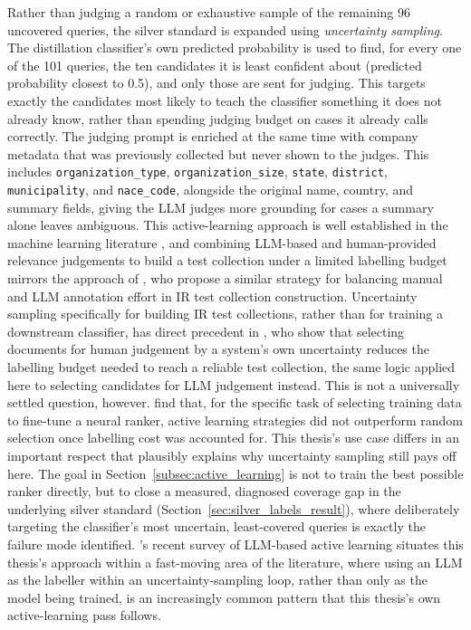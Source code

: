 \documentclass[a4paper,oneside,bibliography=totoc]{scrbook}
\begin{document}
Rather than judging a random or exhaustive sample of the remaining 96 uncovered queries, the silver standard is expanded using \emph{uncertainty sampling}. The distillation classifier's own predicted probability is used to find, for every one of the 101 queries, the ten candidates it is least confident about (predicted probability closest to 0.5), and only those are sent for judging. This targets exactly the candidates most likely to teach the classifier something it does not already know, rather than spending judging budget on cases it already calls correctly. The judging prompt is enriched at the same time with company metadata that was previously collected but never shown to the judges. This includes \texttt{organization\_type}, \texttt{organization\_size}, \texttt{state}, \texttt{district}, \texttt{municipality}, and \texttt{nace\_code}, alongside the original name, country, and summary fields, giving the LLM judges more grounding for cases a summary alone leaves ambiguous. This active-learning approach is well established in the machine learning literature \citep{settles2009active}, and combining LLM-based and human-provided relevance judgements to build a test collection under a limited labelling budget mirrors the approach of \citet{takehi2024llmassisted}, who propose a similar strategy for balancing manual and LLM annotation effort in IR test collection construction. Uncertainty sampling specifically for building IR test collections, rather than for training a downstream classifier, has direct precedent in \citet{rahman2020efficient}, who show that selecting documents for human judgement by a system's own uncertainty reduces the labelling budget needed to reach a reliable test collection, the same logic applied here to selecting candidates for LLM judgement instead. This is not a universally settled question, however. \citet{althammer2023annotating} find that, for the specific task of selecting training data to fine-tune a neural ranker, active learning strategies did not outperform random selection once labelling cost was accounted for. This thesis's use case differs in an important respect that plausibly explains why uncertainty sampling still pays off here. The goal in Section~\ref{subsec:active_learning} is not to train the best possible ranker directly, but to close a measured, diagnosed coverage gap in the underlying silver standard (Section~\ref{sec:silver_labels_result}), where deliberately targeting the classifier's most uncertain, least-covered queries is exactly the failure mode identified. \citet{xia2025fromselection}'s recent survey of LLM-based active learning situates this thesis's approach within a fast-moving area of the literature, where using an LLM as the labeller within an uncertainty-sampling loop, rather than only as the model being trained, is an increasingly common pattern that this thesis's own active-learning pass follows.
\end{document}
